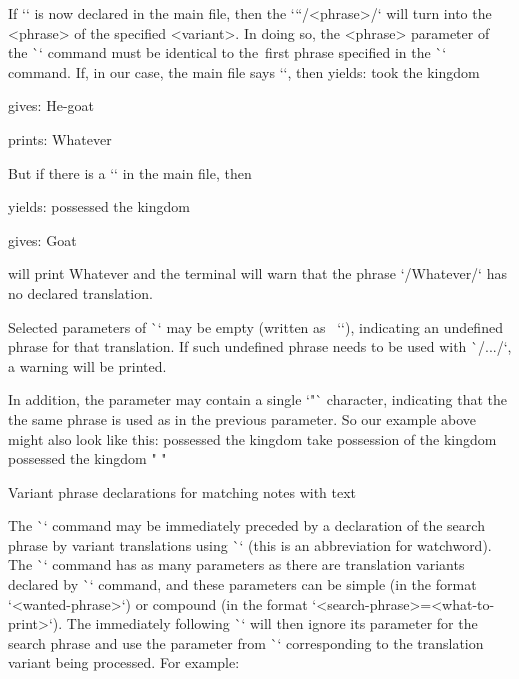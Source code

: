 \endtt

If `\def\tmark {<variant>}` is now declared in the main file,
then the `\x``/<phrase>/` will turn into the <phrase> of the specified <variant>.
In doing so, the <phrase> parameter of the \`\x` command must be identical to the~first phrase 
specified in the \`\vdef` command. If, in our case, the main file says `\def\tmark{BBE}`, then
\medskip
{} yields: took the kingdom 

 gives: He-goat

 prints: Whatever

\medskip

But if there is a `\def\tmark{Jubilee2000}` in the main file, then

\medskip
{} yields: possessed the kingdom 

 gives: Goat

  will print Whatever and the terminal will warn
                                  that the phrase `/Whatever/` has no declared translation.
\medskip



Selected parameters of \`\vdef` may be empty (written as ~`{}`),
indicating an undefined phrase for that translation.
If such undefined phrase needs to be used with \`\x/.../`, a warning will be printed.

In addition, the parameter may contain a single `"` character, indicating that the
the same phrase is used as in the previous parameter. So our
example above might also look like this:
\begtt
{} %
      {possessed the kingdom} %
      {take possession of the kingdom} %
      {possessed the kingdom} %
      {"} %
      {"} %
\endtt

\secc[ww] Variant phrase declarations for matching notes with text

The \`\Note` command may be immediately preceded by a declaration of the search
phrase by variant translations using \`\ww` (this is an abbreviation for watchword).
The \`\ww` command has as many parameters as there are translation variants declared by
\`\variants` command, and these parameters can be simple (in the format
`{<wanted-phrase>}`) or compound (in the format
`{<search-phrase>}={<what-to-print>}`). The immediately following \`\Note`
will then ignore its parameter for the search phrase and use the parameter from \`\ww`
corresponding to the translation variant being processed. For example:

